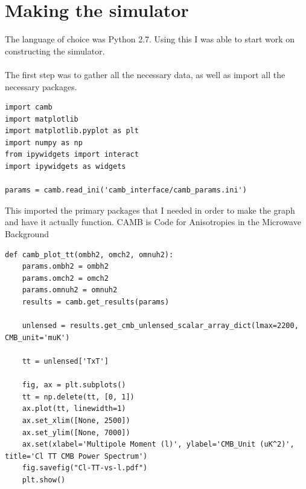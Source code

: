 \documentclass[twoside, fontsize=12pt,
     bibliography=totoc, %
     listof=totoc, %
     index=totoc, %
     onehalfspacing %
]{_MScDiss2017_cls}
\begin{document}
\section{Making the simulator}

The language of choice was Python 2.7. Using this I was able to start work on constructing the simulator.

\paragraph{}

The first step was to gather all the necessary data, as well as import all the necessary packages. 

\begin{lstlisting}[caption={Setting up}, captionpos=b]
import camb
import matplotlib
import matplotlib.pyplot as plt
import numpy as np
from ipywidgets import interact
import ipywidgets as widgets

params = camb.read_ini('camb_interface/camb_params.ini')
\end{lstlisting}

This imported the primary packages that I needed in order to make the graph and have it actually function. CAMB is Code for Anisotropies in the Microwave Background

\begin{lstlisting}[caption={Initialising the first plot}, captionpos=b]
%matplotlib inline
def camb_plot_tt(ombh2, omch2, omnuh2):
    params.ombh2 = ombh2
    params.omch2 = omch2
    params.omnuh2 = omnuh2
    results = camb.get_results(params)

    unlensed = results.get_cmb_unlensed_scalar_array_dict(lmax=2200, CMB_unit='muK')

    tt = unlensed['TxT']

    fig, ax = plt.subplots()
    tt = np.delete(tt, [0, 1])
    ax.plot(tt, linewidth=1)
    ax.set_xlim([None, 2500])
    ax.set_ylim([None, 7000])
    ax.set(xlabel='Multipole Moment (l)', ylabel='CMB_Unit (uK^2)', title='Cl TT CMB Power Spectrum')
    fig.savefig("Cl-TT-vs-l.pdf")
    plt.show()

\end{lstlisting}
\end{document}
